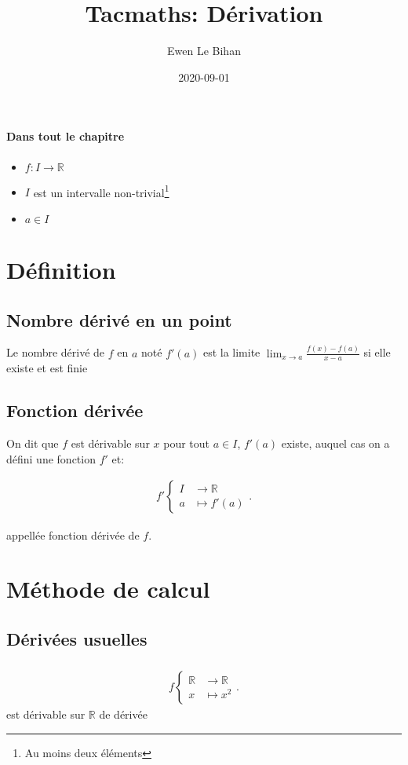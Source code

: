 \documentclass{article}
\title{Tacmaths: Dérivation}
\author{Ewen Le Bihan}
\date{2020-09-01}
\newcommand{\R}{\mathbb{R}}
\begin{document}
\maketitle

\paragraph{Dans tout le chapitre}
\begin{itemize}
	\item $f:I\to \R$
	\item $I$ est un intervalle non-trivial\footnote{Au moins deux éléments}
	\item $a \in I$
\end{itemize}

\section{Définition}
\subsection{Nombre dérivé en un point}

Le nombre dérivé de $f$ en $a$ noté $f'(a)$ est la limite $\lim_{x \to a} \frac{f(x)-f(a)}{x-a}$ si elle existe et est finie

\subsection{Fonction dérivée}
On dit que $f$ est dérivable sur $x$ pour tout $a\in I$, $f'(a)$ existe, auquel cas on a défini une fonction $f'$ et:

\begin{align*}
	f'\begin{cases}
		I&\to \R \\
		a&\mapsto f'(a)
	\end{cases}
.\end{align*}

appellée fonction dérivée de $f$.

\section{Méthode de calcul}
\subsection{Dérivées usuelles}
\subsubsection{}
\begin{align*}
	f \begin{cases}
		\R&\to \R \\
		x&\mapsto x^2
	\end{cases}
.\end{align*} est dérivable sur $\R$ de dérivée
\end{document}
